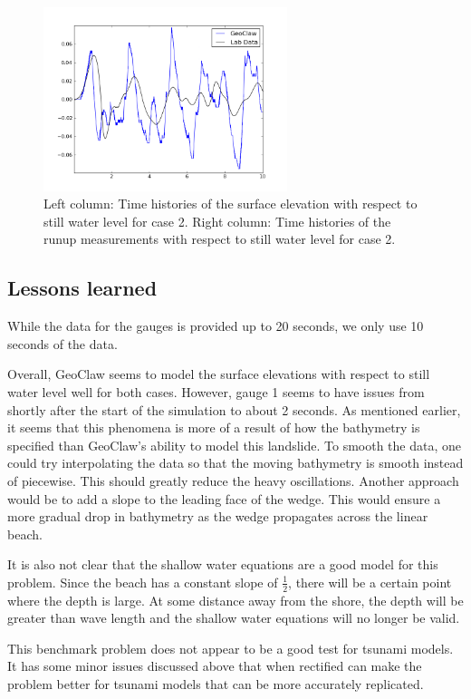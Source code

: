 \begin{figure}[ht]
\hfil\includegraphics[width=2.8in]{bp12/case2runupgauge2.png}\hfil
\caption{\label{fig:bp8gauges2}
Left column: Time histories of the surface elevation with respect to still
water level for case 2.
Right column: Time histories of the runup measurements with respect
to still water level for case 2.
  }
\end{figure}


\subsection{Lessons learned}


While the data for the gauges is provided up to 20 seconds, we only use 10 seconds
of the data.

Overall, GeoClaw seems to model the surface elevations with respect to still water
level well for both cases.  However, gauge 1 seems to have issues from shortly
after the start of the simulation to about 2 seconds.  As mentioned earlier, it seems
that this phenomena is more of a result of how the bathymetry is specified than
GeoClaw's ability to model this landslide.  To smooth the data, one could try 
interpolating the data so that the moving bathymetry is smooth instead of
piecewise.  This should greatly reduce the heavy oscillations.  Another approach
would be to add a slope to the leading face of the wedge.  This would ensure a 
more gradual drop in bathymetry as the wedge propagates across the linear
beach.

It is also not clear that the shallow water equations are a good model for this
problem.  Since the beach has a constant slope of $\frac{1}{2}$, there will be a 
certain point where the depth is large.  At some distance away from the shore, 
the depth will be greater than wave length and the shallow water equations
will no longer be valid.

This benchmark problem does not appear to be a good test for tsunami models.
It has some minor issues discussed above that when rectified can make the problem
better for tsunami models that can be more accurately replicated.


